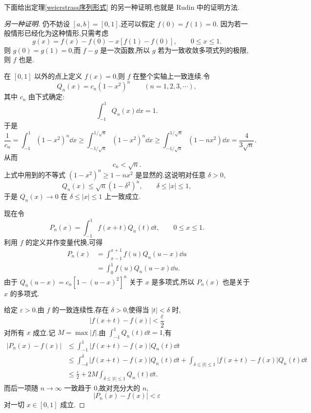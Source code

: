 下面给出定理\ref{weierstrass序列形式} 的另一种证明,也就是 Rudin 中的证明方法.

\begin{proof}[另一种证明]
	仍不妨设 $[a,b]=[0,1]$.还可以假定 $f(0)=f(1)=0$. 因为若一般情形已经化为这种情形,只需考虑
	\[
	g(x)=f(x)-f(0)-x[f(1)-f(0)],\qquad 0\leqslant x\leqslant 1.
	\]
	则 $g(0)=g(1)=0$,而 $f-g$ 是一次函数,所以 $g$ 若为一致收敛多项式列的极限,则 $f$ 也是.
	
	在 $[0,1]$ 以外的点上定义 $f(x)=0$,则 $f$ 在整个实轴上一致连续.令
	\[
	Q_n(x)=c_n(1-x^2)^n\qquad (n=1,2,3,\cdots),
	\]
	其中 $c_n$ 由下式确定:
	\[
	\int_{-1}^{1}Q_n(x)\dd x=1.
	\]
	于是
	\[
	\frac1{c_n}=\int_{-1}^{1}(1-x^2)^n\dd x
	\geqslant \int_{-1/\sqrt n}^{1/\sqrt n}(1-x^2)^n\dd x
	\geqslant \int_{-1/\sqrt n}^{1/\sqrt n}(1-nx^2)\dd x
	=\frac{4}{3\sqrt n}.
	\]
	从而
	\[
	c_n<\sqrt n.
	\]
	上式中用到的不等式 $(1-x^2)^n\geqslant 1-nx^2$ 是显然的.这说明对任意 $\delta>0$,
	\[
	Q_n(x)\leqslant \sqrt n(1-\delta^2)^n,
	\qquad \delta\leqslant |x|\leqslant 1,
	\]
	于是 $Q_n(x)\to0$ 在 $\delta\leqslant |x|\leqslant1$ 上一致成立.
	
	现在令
	\[
	P_n(x)=\int_{-1}^{1}f(x+t)Q_n(t)\dd t,
	\qquad 0\leqslant x\leqslant1.
	\]
	利用 $f$ 的定义并作变量代换,可得
	\[
	\begin{aligned}
		P_n(x)&=\int_{x-1}^{x+1}f(u)Q_n(u-x)\dd u\\
		&=\int_0^1 f(u)Q_n(u-x)\dd u.
	\end{aligned}
	\]
	由于 $Q_n(u-x)=c_n[1-(u-x)^2]^n$ 关于 $x$ 是多项式,所以 $P_n(x)$ 也是关于 $x$ 的多项式.
	
	给定 $\varepsilon>0$.由 $f$ 的一致连续性,存在 $\delta>0$,使得当 $|t|<\delta$ 时,
	\[
	|f(x+t)-f(x)|<\frac{\varepsilon}{2}
	\]
	对所有 $x$ 成立.记 $M=\max |f|$.由 $\int_{-1}^{1}Q_n(t)\dd t=1$,有
	\[
	\begin{aligned}
		|P_n(x)-f(x)|
		&\leqslant \int_{-1}^{1}|f(x+t)-f(x)|Q_n(t)\dd t\\
		&\leqslant \int_{-\delta}^{\delta}|f(x+t)-f(x)|Q_n(t)\dd t
		+\int_{\delta\leqslant |t|\leqslant1}|f(x+t)-f(x)|Q_n(t)\dd t\\
		&\leqslant \frac{\varepsilon}{2}+2M\int_{\delta\leqslant |t|\leqslant1}Q_n(t)\dd t.
	\end{aligned}
	\]
	而后一项随 $n\to\infty$ 一致趋于 $0$,故对充分大的 $n$,
	\[
	|P_n(x)-f(x)|<\varepsilon
	\]
	对一切 $x\in[0,1]$ 成立.
\end{proof}